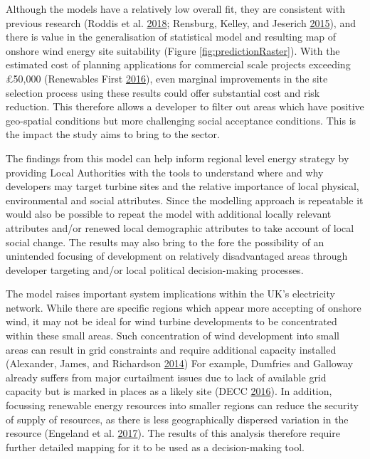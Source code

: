 \documentclass[a4paper,]{article}
\theoremstyle{definition}
\theoremstyle{definition}
\theoremstyle{definition}
\theoremstyle{remark}
\begin{document}
Although the models have a relatively low overall fit, they are
consistent with previous research (Roddis et al.
\protect\hyperlink{ref-Roddis2018}{2018}; Rensburg, Kelley, and Jeserich
\protect\hyperlink{ref-VanRensburg20}{2015}), and there is value in the
generalisation of statistical model and resulting map of onshore wind
energy site suitability (Figure \ref{fig:predictionRaster}). With the
estimated cost of planning applications for commercial scale projects
exceeding £50,000 (Renewables First
\protect\hyperlink{ref-RF2016}{2016}), even marginal improvements in the
site selection process using these results could offer substantial cost
and risk reduction. This therefore allows a developer to filter out
areas which have positive geo-spatial conditions but more challenging
social acceptance conditions. This is the impact the study aims to bring
to the sector.

The findings from this model can help inform regional level energy
strategy by providing Local Authorities with the tools to understand
where and why developers may target turbine sites and the relative
importance of local physical, environmental and social attributes. Since
the modelling approach is repeatable it would also be possible to repeat
the model with additional locally relevant attributes and/or renewed
local demographic attributes to take account of local social change. The
results may also bring to the fore the possibility of an unintended
focusing of development on relatively disadvantaged areas through
developer targeting and/or local political decision-making processes.

The model raises important system implications within the UK's
electricity network. While there are specific regions which appear more
accepting of onshore wind, it may not be ideal for wind turbine
developments to be concentrated within these small areas. Such
concentration of wind development into small areas can result in grid
constraints and require additional capacity installed (Alexander, James,
and Richardson \protect\hyperlink{ref-alexander2014energy}{2014}) For
example, Dumfries and Galloway already suffers from major curtailment
issues due to lack of available grid capacity but is marked in places as
a likely site (DECC \protect\hyperlink{ref-DECC2016}{2016}). In
addition, focussing renewable energy resources into smaller regions can
reduce the security of supply of resources, as there is less
geographically dispersed variation in the resource (Engeland et al.
\protect\hyperlink{ref-ENGELAND2017600}{2017}). The results of this
analysis therefore require further detailed mapping for it to be used as
a decision-making tool.
\end{document}
